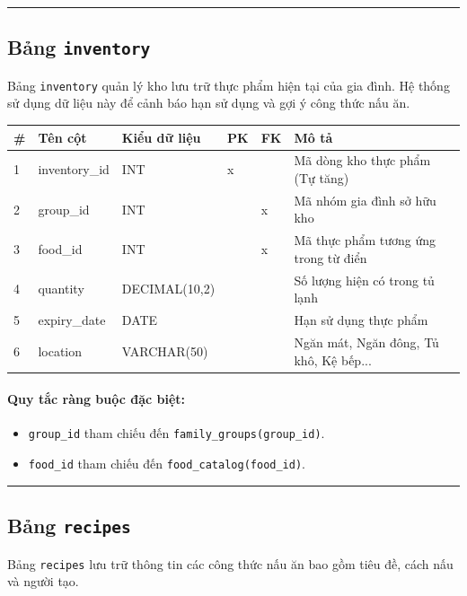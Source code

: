 \documentclass[12pt,a4paper]{article}
\begin{document}
\vskip 0.5cm
\noindent\rule{\textwidth}{0.5pt}
\vskip 0.5cm

\subsection{Bảng \texttt{inventory}}
Bảng \texttt{inventory} quản lý kho lưu trữ thực phẩm hiện tại của gia đình. Hệ thống sử dụng dữ liệu này để cảnh báo hạn sử dụng và gợi ý công thức nấu ăn.

\begin{longtable}{|p{0.5cm}|p{3.4cm}|p{3.2cm}|p{0.7cm}|p{0.7cm}|p{3.6cm}|}
\hline
\textbf{\#} & \textbf{Tên cột} & \textbf{Kiểu dữ liệu} & \textbf{PK} & \textbf{FK} & \textbf{Mô tả} \\ \hline
\endhead
1 & inventory\_id & INT & x & & Mã dòng kho thực phẩm (Tự tăng) \\ \hline
2 & group\_id & INT & & x & Mã nhóm gia đình sở hữu kho \\ \hline
3 & food\_id & INT & & x & Mã thực phẩm tương ứng trong từ điển \\ \hline
4 & quantity & DECIMAL(10,2) & & & Số lượng hiện có trong tủ lạnh \\ \hline
5 & expiry\_date & DATE & & & Hạn sử dụng thực phẩm \\ \hline
6 & location & VARCHAR(50) & & & Ngăn mát, Ngăn đông, Tủ khô, Kệ bếp... \\ \hline
\end{longtable}

\paragraph{Quy tắc ràng buộc đặc biệt:}
\begin{itemize}
    \item \texttt{group\_id} tham chiếu đến \texttt{family\_groups(group\_id)}.
    \item \texttt{food\_id} tham chiếu đến \texttt{food\_catalog(food\_id)}.
\end{itemize}

\vskip 0.5cm
\noindent\rule{\textwidth}{0.5pt}
\vskip 0.5cm

\subsection{Bảng \texttt{recipes}}
Bảng \texttt{recipes} lưu trữ thông tin các công thức nấu ăn bao gồm tiêu đề, cách nấu và người tạo.
\end{document}
